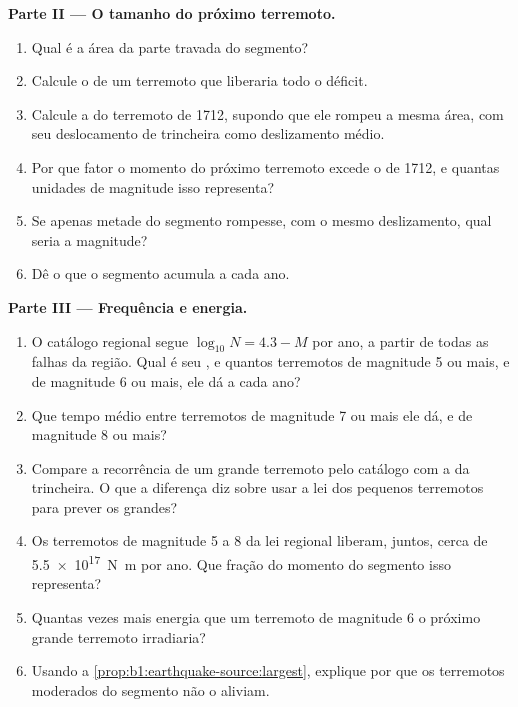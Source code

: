 \begin{problem}
\medskip
\noindent\textbf{Parte II --- O tamanho do próximo terremoto.}
\begin{enumerate}[resume]
  \item Qual é a área da parte travada do segmento?
  \item Calcule o  de um terremoto que liberaria todo o déficit.
  \item Calcule a  do terremoto de 1712, supondo que ele rompeu a mesma área, com seu deslocamento de trincheira como deslizamento médio.
  \item Por que fator o momento do próximo terremoto excede o de 1712, e quantas unidades de magnitude isso representa?
  \item Se apenas metade do segmento rompesse, com o mesmo deslizamento, qual seria a magnitude?
  \item Dê o  que o segmento acumula a cada ano.
\end{enumerate}

\medskip
\noindent\textbf{Parte III --- Frequência e energia.}
\begin{enumerate}[resume]
  \item O catálogo regional segue $\log_{10} N = 4.3 - M$ por ano, a partir de todas as falhas da região. Qual é seu , e quantos terremotos de magnitude 5 ou mais, e de magnitude 6 ou mais, ele dá a cada ano?
  \item Que tempo médio entre terremotos de magnitude 7 ou mais ele dá, e de magnitude 8 ou mais?
  \item Compare a recorrência de um grande terremoto pelo catálogo com a da trincheira. O que a diferença diz sobre usar a lei dos pequenos terremotos para prever os grandes?
  \item Os terremotos de magnitude 5 a 8 da lei regional liberam, juntos, cerca de \qty{5.5e17}{N.m} por ano. Que fração do momento do segmento isso representa?
  \item Quantas vezes mais energia que um terremoto de magnitude 6 o próximo grande terremoto irradiaria?
  \item Usando a \cref{prop:b1:earthquake-source:largest}, explique por que os terremotos moderados do segmento não o aliviam.
\end{enumerate}


\end{problem}
